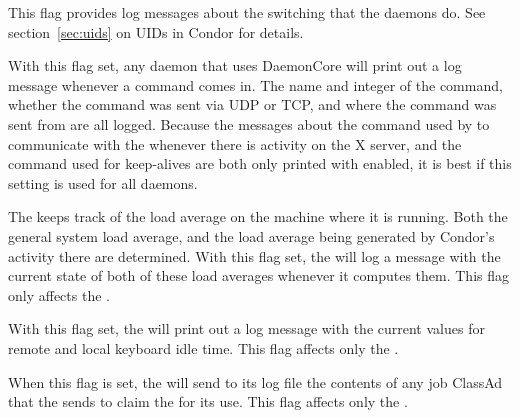 \begin{description}
\begin{description}
  \label{dflag:priv}
  \item[\Dflag{PRIV}]
    This flag provides log
    messages about the  switching that the daemons
    do.  See section~\ref{sec:uids} on UIDs in Condor for details.

  \label{dflag:command}
  \item[\Dflag{COMMAND}]
    With this flag set, any
    daemon that uses DaemonCore will print out a log message
    whenever a command comes in.  The name and integer of the command,
    whether the command was sent via UDP or TCP, and where
    the command was sent from are all logged.  
    Because the messages about the command used by  to
    communicate with the  whenever there is activity on
    the X server, and the command used for keep-alives are both only
    printed with  enabled, it is best if this setting
    is used for all daemons.

  \label{dflag:load}
  \item[\Dflag{LOAD}]
    The  keeps track
    of the load average on the machine where it is running.  Both the
    general system load average, and the load average being generated by
    Condor's activity there are determined.
    With this flag set, the 
    will log a message with the current state of both of these
    load averages whenever it computes them.  This flag only affects the
    .

  \label{dflag:keyboard} 
  \item[\Dflag{KEYBOARD}]
    With this flag set, the  will print out a log message
    with the current values for remote and local keyboard idle time.
    This flag affects only the .

  \label{dflag:job}
  \item[\Dflag{JOB}]
    When this flag is set, the
     will send to its log file the contents of any
    job ClassAd that the  sends to claim the
     for its use.  This flag affects only the
    .
    

\end{description}
\end{description}
